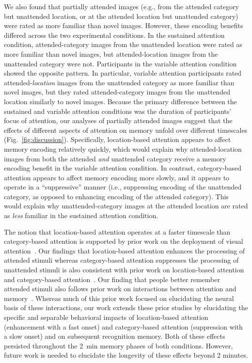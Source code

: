 \documentclass[english]{article}
\begin{document}
We also found that partially attended images (e.g., from the attended category
but unattended location, or at the attended location but unattended category)
were rated as more familiar than novel images. However, these encoding benefits
differed across the two experimental conditions. In the sustained attention
condition, attended-category images from the unattended location were rated as
more familiar than novel images, but attended-location images from the
unattended category were not. Participants in the variable attention condition
showed the opposite pattern. In particular, variable attention participants
rated attended-\textit{location} images from the unattended category as more
familiar than novel images, but they rated attended-category images from the
unattended location similarly to novel images. Because the primary difference
between the sustained and variable attention conditions was the duration of
participants' focus of attention, our analyses of partially attended images
suggest that the effects of different aspects of attention on memory unfold
over different timescales (Fig.~\ref{fig:discussion}). Specifically,
location-based attention appears to affect memory encoding relatively quickly,
which would explain why attended-location images from both the attended
\textit{and} unattended category receive a memory encoding benefit in the
variable attention condition. In contrast, category-based attention appears to
affect memory encoding more slowly, and it appears to operate in a
``suppressive'' manner (i.e., suppressing encoding of the unattended category,
as opposed to enhancing encoding of the attended category). This would explain
why unattended-category images at the attended location are rated as
\textit{less} familiar in the sustained attention condition.

The notion that location-based attention operates at a faster timescale than
category-based attention is supported by prior work on the deployment of visual
attention~\citep{SotoBlan04, StopEtal07}. Our findings that location-based
attention enhances the processing of attended stimuli whereas category-based
attention suppresses the processing of unattended stimuli is also consistent
with prior work on location-based attention~\citep[e.g.,][]{IttiKoch01} and
category-based attention~\citep[e.g.,][]{MoheEtal14}. Our finding that people
better remember attended stimuli also follows prior work on interactions
between attention and memory~\citep{PallWagn02, ChunTurk07, AlyTurk16,
AlyTurk17, WittEtal18, MorrEtal14, BaleEtal21}. Whereas much of this prior work
focused on elucidating the neural basis of these interactions, our work extends
these prior studies by elucidating the specific and separable behavioral
impacts of location-based attention (enhancement with a fast onset) and
category-based attention (suppression with a slow onset) and on subsequent
recognition memory. Both of these effects persisted throughout the 2~min memory
phases of both conditions. However, future work is needed to elucidate the
longevity of these effects beyond 2 minutes.
\end{document}
